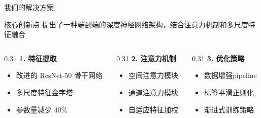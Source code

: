 \documentclass[aspectratio=169,11pt]{beamer}
\begin{document}
\begin{frame}{我们的解决方案}
    \begin{block}{核心创新点}
        提出了一种端到端的深度神经网络架构，结合注意力机制和多尺度特征融合
    \end{block}
    
    \vspace{0.5em}
    \begin{columns}[T]
        \begin{column}{0.31\textwidth}
            \textbf{1. 特征提取}
            \begin{itemize}
                \item 改进的 ResNet-50 骨干网络
                \item 多尺度特征金字塔
                \item 参数量减少 40\%
            \end{itemize}
        \end{column}
        \begin{column}{0.31\textwidth}
            \textbf{2. 注意力机制}
            \begin{itemize}
                \item 空间注意力模块
                \item 通道注意力模块
                \item 自适应特征加权
            \end{itemize}
        \end{column}
        \begin{column}{0.31\textwidth}
            \textbf{3. 优化策略}
            \begin{itemize}
                \item 数据增强pipeline
                \item 标签平滑正则化
                \item 渐进式训练策略
            \end{itemize}
        \end{column}
    \end{columns}
\end{frame}
\end{document}
